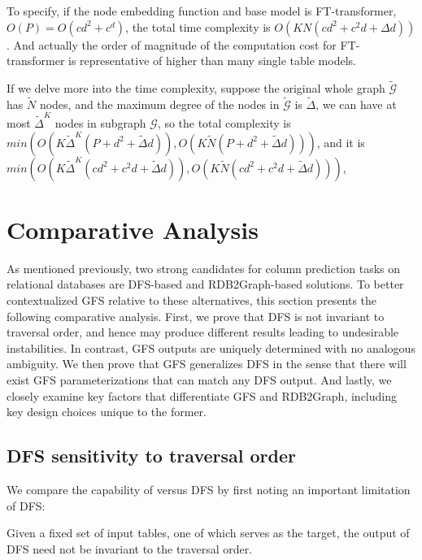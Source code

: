 To specify, if the node embedding function and base model is FT-transformer, $O(P)=O(cd^2+c^d)$, the total time complexity is $O(KN(cd^2+c^2d+\Delta d))$. And actually the order of magnitude of the computation cost for FT-transformer is representative of higher than many single table models.

If we delve more into the time complexity, suppose the original whole graph $\tilde{\mathcal{G}}$ has $\tilde{N}$ nodes, and the maximum degree of the nodes in $\tilde{\mathcal{G}}$ is $\tilde{\Delta}$, we can have at most $\tilde{\Delta}^K$ nodes in subgraph $\mathcal{G}$, so the total complexity is $min(O(K\tilde{\Delta}^K(P+d^2+\tilde{\Delta}d)), O(K\tilde{N}(P+d^2+\tilde{\Delta}d)))$, and it is $min(O(K\tilde{\Delta}^K(cd^2+c^2d+\tilde{\Delta}d)), O(K\tilde{N}(cd^2+c^2d+\tilde{\Delta}d)))$,

\section{Comparative Analysis}\label{sec:property}
As mentioned previously, two strong candidates for column prediction tasks on relational databases are DFS-based and RDB2Graph-based solutions.  To better contextualized GFS relative to these alternatives, this section presents the following comparative analysis.  First, we prove that DFS is not invariant to traversal order, and hence may produce different results leading to undesirable instabilities.  In contrast, GFS outputs are uniquely determined with no analogous ambiguity.  We then prove that GFS generalizes DFS in the sense that there will exist GFS parameterizations that can match any DFS output.  And lastly, we closely examine key factors that differentiate GFS and RDB2Graph, including key design choices unique to the former.

\subsection{DFS sensitivity to traversal order}

We compare the capability of \model{} versus DFS by first noting an important limitation of DFS:

\begin{theorem}\label{thm:DFS variant}
    Given a fixed set of input tables, one of which serves as the target, the output of DFS need not be invariant to the traversal order.
\end{theorem}

